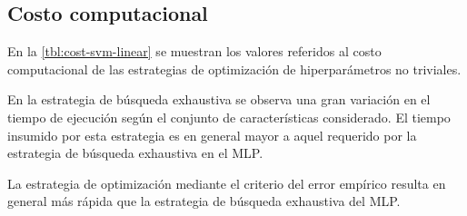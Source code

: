 %
%
\subsection{Costo computacional}
%
En la \autoref{tbl:cost-svm-linear} se muestran los valores referidos
al costo computacional de las estrategias de optimización de
hiperparámetros no triviales.

En la estrategia de búsqueda exhaustiva
se observa una gran variación en el tiempo de ejecución según el
conjunto de características considerado. El tiempo insumido por esta
estrategia es en general mayor a aquel requerido por la estrategia de
búsqueda exhaustiva en el MLP.

La estrategia de optimización mediante el criterio del error empírico
resulta en general más rápida que la estrategia de búsqueda exhaustiva
del MLP.
